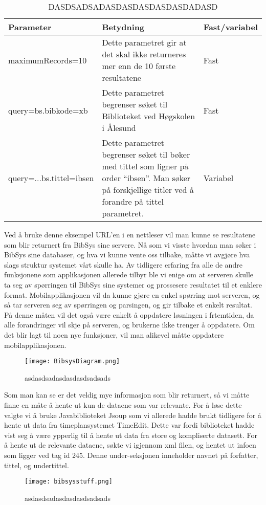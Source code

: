 \documentclass[../main.tex]{subfiles}
\begin{document}
\begin{table}[H]
\begin{center}
\caption{DASDSADSADASDASDASDASDASDADASD}
  \begin{tabular}{ | p{4cm} | p{8cm} | p{2cm} |}
    \hline
    Parameter & Betydning & Fast/variabel \\ \hline
    maximumRecords=10 & Dette parametret gir at det skal ikke returneres mer enn de 10 første resultatene & Fast \\ \hline
    query=bs.bibkode=xb & Dette parametret begrenser søket til Biblioteket ved Høgskolen i Ålesund & Fast \\ \hline
    query=...bs.tittel=ibsen & Dette parametret begrenser søket til bøker med tittel som ligner på order “ibsen”. Man søker på forskjellige titler ved å forandre på tittel parametret. & Variabel \\
    \hline
  \end{tabular}
\end{center}
\end{table}

Ved å bruke denne eksempel URL’en i en nettleser vil man kunne se resultatene som blir returnert fra BibSys sine servere.\newline
\newline
Nå som vi visste hvordan man søker i BibSys sine databaser, og hva vi kunne vente oss tilbake, måtte vi avgjøre hva slags struktur systemet vårt skulle ha. Av tidligere erfaring fra alle de andre funksjonene som applikasjonen allerede tilbyr ble vi enige om at serveren skulle ta seg av spørringen til BibSys sine systemer og prossesere resultatet til et enklere format. Mobilapplikasjonen vil da kunne gjøre en enkel spørring mot serveren, og så tar serveren seg av spørringen og parsingen, og gir tilbake et enkelt resultat. På denne måten vil det også være enkelt å oppdatere løsningen i frtemtiden, da alle forandringer vil skje på serveren, og brukerne ikke trenger å oppdatere. Om det blir lagt til noen nye funksjoner, vil man alikevel måtte oppdatere mobilapplikasjonen.

\begin{figure}[H]
  \centering
  \texttt{[image: BibsysDiagram.png]}
  \caption{asdasdsadasdasdasdsadsads}
\end{figure}

Som man kan se er det veldig mye informasjon som blir returnert, så vi måtte finne en måte å hente ut kun de dataene som var relevante. For å løse dette valgte vi å bruke Javabiblioteket Jsoup som vi allerede hadde brukt tidligere for å hente ut data fra timeplansystemet TimeEdit. Dette var fordi biblioteket hadde vist seg å være ypperlig til å hente ut data fra store og kompliserte datasett.\newline
\newline
For å hente ut de relevante dataene, søkte vi igjennom xml filen, og hentet ut infoen som ligger ved tag id 245. Denne under-seksjonen inneholder navnet på forfatter, tittel, og undertittel.
\begin{figure}[H]
  \centering
  \texttt{[image: bibsysstuff.png]}
  \caption{asdasdsadasdasdasdsadsads}
\end{figure}
\end{document}
